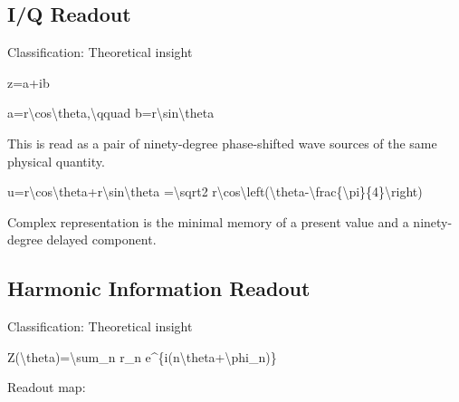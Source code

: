 \documentclass[
  a4paper]{article}
\newenvironment{Shaded}{}{}
\newcommand{\NormalTok}[1]{#1}
\begin{document}
\subsection{I/Q Readout}\label{iq-readout}

Classification: Theoretical insight

\begin{Shaded}
\begin{Highlighting}[]
\NormalTok{z=a+ib}
\end{Highlighting}
\end{Shaded}

\begin{Shaded}
\begin{Highlighting}[]
\NormalTok{a=r\textbackslash{}cos\textbackslash{}theta,\textbackslash{}qquad b=r\textbackslash{}sin\textbackslash{}theta}
\end{Highlighting}
\end{Shaded}

This is read as a pair of ninety-degree phase-shifted wave sources of
the same physical quantity.

\begin{Shaded}
\begin{Highlighting}[]
\NormalTok{u=r\textbackslash{}cos\textbackslash{}theta+r\textbackslash{}sin\textbackslash{}theta}
\NormalTok{=\textbackslash{}sqrt2 r\textbackslash{}cos\textbackslash{}left(\textbackslash{}theta{-}\textbackslash{}frac\{\textbackslash{}pi\}\{4\}\textbackslash{}right)}
\end{Highlighting}
\end{Shaded}

Complex representation is the minimal memory of a present value and a
ninety-degree delayed component.

\subsection{Harmonic Information
Readout}\label{harmonic-information-readout}

Classification: Theoretical insight

\begin{Shaded}
\begin{Highlighting}[]
\NormalTok{Z(\textbackslash{}theta)=\textbackslash{}sum\_n r\_n e\^{}\{i(n\textbackslash{}theta+\textbackslash{}phi\_n)\}}
\end{Highlighting}
\end{Shaded}

Readout map:
\end{document}
